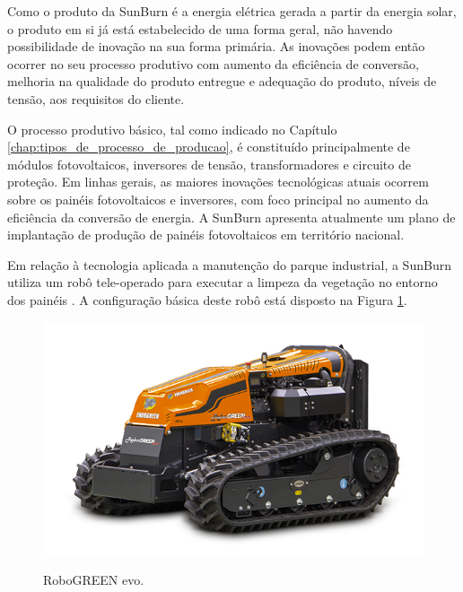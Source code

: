 Como o produto da SunBurn é a energia elétrica gerada a partir da energia solar, o produto em si já está estabelecido de uma forma geral, não havendo possibilidade de inovação na sua forma primária. As inovações podem então ocorrer no seu processo produtivo com aumento da eficiência de conversão, melhoria na qualidade do produto entregue e adequação do produto, níveis de tensão, aos requisitos do cliente.

O processo produtivo básico, tal como indicado no Capítulo \ref{chap:tipos_de_processo_de_producao}, é constituído principalmente de módulos fotovoltaicos, inversores de tensão, transformadores e circuito de proteção. Em linhas gerais, as maiores inovações tecnológicas atuais ocorrem sobre os painéis fotovoltaicos e inversores, com foco principal no aumento da eficiência da conversão de energia. A SunBurn apresenta atualmente um plano de implantação de produção de painéis fotovoltaicos em território nacional.

Em relação à tecnologia aplicada a manutenção do parque industrial, a SunBurn utiliza um robô tele-operado para executar a limpeza da vegetação no entorno dos painéis \cite{energreen}. A configuração básica deste robô está disposto na Figura \ref{fig:energreen}.

\begin{figure}[H]
  \caption{RoboGREEN evo.}
  \includegraphics[width=1\textwidth]{images/robogreen_evo.png}
  \label{fig:energreen}
\end{figure}
